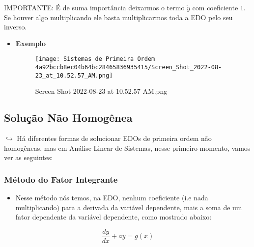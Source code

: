 \documentclass[]{article}
\providecommand{\tightlist}{%
  \setlength{\itemsep}{0pt}\setlength{\parskip}{0pt}}
\begin{document}
  IMPORTANTE: É de suma importância deixarmos o termo \(\dot y\) com
  coeficiente \(1\). Se houver algo multiplicando ele basta multiplicarmos
  toda a EDO pelo seu inverso.

  \begin{itemize}
  \item
    \textbf{Exemplo}

    \begin{figure}
    \centering
    \texttt{[image: Sistemas de Primeira Ordem 4a92bccb8ec04b64bc28465836935415/Screen\_Shot\_2022-08-23\_at\_10.52.57\_AM.png]}
    \caption{Screen Shot 2022-08-23 at 10.52.57 AM.png}
    \end{figure}
  \end{itemize}

  \hypertarget{soluuxe7uxe3o-nuxe3o-homoguxeanea}{%
  \subsection{Solução Não
  Homogênea}\label{soluuxe7uxe3o-nuxe3o-homoguxeanea}}

  \(\hookrightarrow\) Há diferentes formas de solucionar EDOs de primeira
  ordem não homogêneas, mas em Análise Linear de Sistemas, nesse primeiro
  momento, vamos ver as seguintes:

  \hypertarget{muxe9todo-do-fator-integrante}{%
  \subsubsection{Método do Fator
  Integrante}\label{muxe9todo-do-fator-integrante}}

  \begin{itemize}
  \tightlist
  \item
    Nesse método nós temos, na EDO, nenhum coeficiente (i.e nada
    multiplicando) para a derivada da variável dependente, mais a soma de
    um fator dependente da variável dependente, como mostrado abaixo:
  \end{itemize}

  \[
  \frac{dy}{dx} + ay = g(x)
  \]
\end{document}
